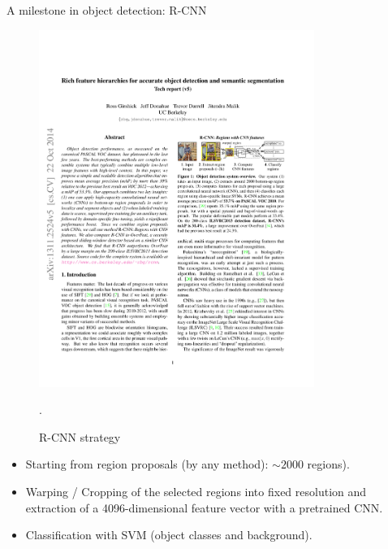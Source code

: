 \documentclass[xcolor=pdftex,dvipsnames,table]{beamer}
\begin{document}
\begin{frame}{A milestone in object detection: R-CNN}
\begin{figure}[htb]
   \centering
   \includegraphics[width=0.8\textwidth]{../graphics/R-CNN.pdf}
   \caption{R-CNN strategy \cite{Girshick2014}}.
\end{figure}
\begin{itemize}
	\item Starting from region proposals (by any method): $\sim 2000$ regions). 
	\item Warping / Cropping of the selected regions into fixed resolution and extraction of a 4096-dimensional feature vector with a pretrained CNN. 
	\item Classification with SVM (object classes and background). 
\end{itemize}
\end{frame}
\end{document}

